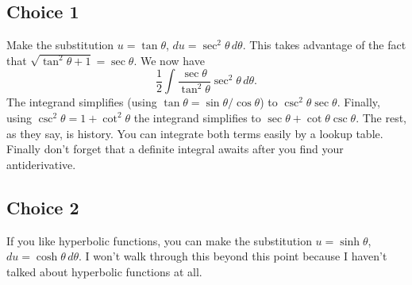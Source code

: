 \documentclass[11pt,oneside]{amsart}
\theoremstyle{definition}
\begin{document}
    \subsection*{Choice 1}
    Make the substitution $u=\tan\theta$, $du=\sec^2\theta\,d\theta$. This takes advantage of the fact that $\sqrt{\tan^2\theta+1}=\sec\theta$. We now have
    \[\frac12\int \frac{\sec\theta}{\tan^2\theta}\sec^2\theta\,d\theta. \]
    The integrand simplifies (using $\tan\theta=\sin\theta/\cos\theta$) to $\csc^2\theta\sec\theta$. Finally, using $\csc^2\theta=1+\cot^2\theta$ the integrand simplifies to $\sec\theta+\cot\theta\csc\theta$. The rest, as they say, is history. You can integrate both terms easily by a lookup table. Finally don't forget that a definite integral awaits after you find your antiderivative.

    \subsection*{Choice 2}
    If you like hyperbolic functions, you can make the substitution $u=\sinh\theta$, $du=\cosh\theta\,d\theta$. I won't walk through this beyond this point because I haven't talked about hyperbolic functions at all.
\end{document}
